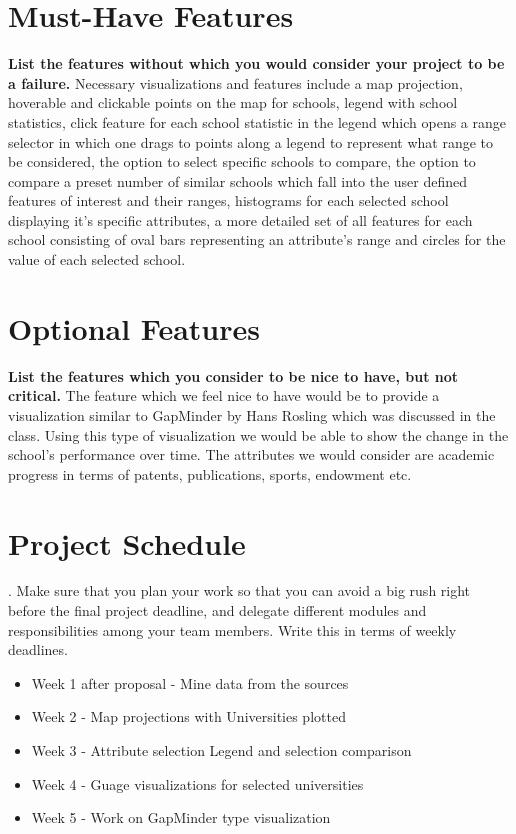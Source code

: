 \documentclass[11pt, a4paper]{article}
\begin{document}
  \section{Must-Have Features}\textbf{ List the features without which you would consider your project to be a failure.}
  Necessary visualizations and features include a map projection, hoverable and clickable points on the map for schools, legend with school statistics, click feature for each school statistic in the legend which opens a range selector in which one drags to points along a legend to represent what range to be considered, the option to select specific schools to compare, the option to compare a preset number of similar schools which fall into the user defined features of interest and their ranges, histograms for each selected school displaying it's specific attributes, a more detailed set of all features for each school consisting of oval bars representing an attribute's range and circles for the value of each selected school.

\section{Optional Features}\textbf{ List the features which you consider to be nice to have, but not critical.}
The feature which we feel nice to have would be to provide a visualization similar to GapMinder by Hans Rosling which was discussed in the class. Using this type of visualization we would be able to show the change in the school's performance over time.
The attributes we would consider are academic progress in terms of patents, publications, sports, endowment etc.

\vspace{5em}
\section{Project Schedule}{. Make sure that you plan your work so that you can avoid a big rush right before the final project deadline, and delegate different modules and responsibilities among your team members. Write this in terms of weekly deadlines.}
\begin{itemize}
\item Week 1 after proposal - Mine data from the sources
\item Week 2 - Map projections with Universities plotted
\item Week 3 -  Attribute selection Legend and selection comparison
\item Week 4 - Guage visualizations for selected universities
\item Week 5 - Work on GapMinder type visualization
\end{itemize}
\end{document}
